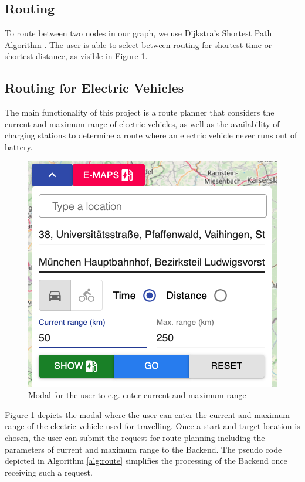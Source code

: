\documentclass[a4paper]{article}
\begin{document}
\subsection{Routing}
To route between two nodes in our graph, we use Dijkstra's Shortest Path Algorithm \cite{Dijkstra1959}.
The user is able to select between routing for shortest time or shortest distance, as visible in Figure \ref{fig:input}.
\subsection{Routing for Electric Vehicles}
The main functionality of this project is a route planner that considers the current and maximum range of electric vehicles, as well as the availability of charging stations to determine a route where an electric vehicle never runs out of battery.
\begin{figure}[h]
    \centering
    \includegraphics[scale=0.45]{figures/input}
    \caption{Modal for the user to e.g. enter current and maximum range}
    \label{fig:input}
\end{figure}
Figure \ref{fig:input} depicts the modal where the user can enter the current and maximum range of the electric vehicle used for travelling.
Once a start and target location is chosen, the user can submit the request for route planning including the parameters of current and maximum range to the Backend.
The pseudo code depicted in Algorithm \ref{alg:route} simplifies the processing of the Backend once receiving such a request.\par\bigskip
\end{document}
